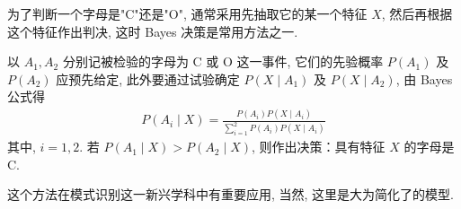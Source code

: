 \documentclass[../../main.tex]{subfiles}
\begin{document}
\begin{example}[Bayes 决策]\label{example:ch02-Bayes决策}
为了判断一个字母是"C"还是"O", 通常采用先抽取它的某一个特征 $X$, 然后再根据这个特征作出判决, 这时 Bayes 决策是常用方法之一.

以 $A_1, A_2$ 分别记被检验的字母为 C 或 O 这一事件, 它们的先验概率 $P(A_1)$ 及 $P(A_2)$ 应预先给定, 此外要通过试验确定 $P(X\mid A_1)$ 及 $P(X\mid A_2)$, 由 Bayes 公式得
\begin{align*}
P(A_i\mid X)=\frac{P(A_i)P(X\mid A_i)}{\sum_{i=1}^{2} P(A_i)P(X\mid A_i)}
\end{align*}
其中, $i=1,2$. 若 $P(A_1\mid X)>P(A_2\mid X)$, 则作出决策：具有特征 $X$ 的字母是 C.

这个方法在模式识别这一新兴学科中有重要应用, 当然, 这里是大为简化了的模型.
\end{example}
\end{document}
